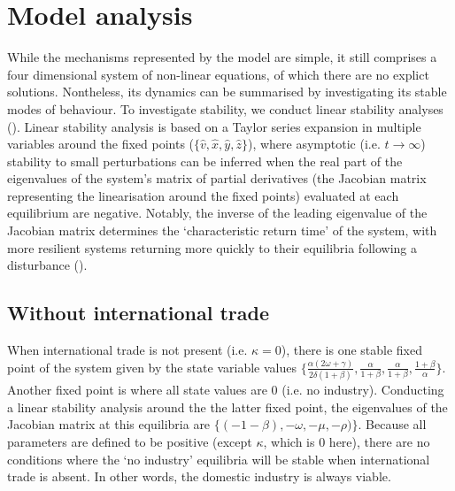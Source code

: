 \documentclass[12pt]{article}
\begin{document}
\section{Model analysis}
While the mechanisms represented by the model are simple, it still comprises a four dimensional system of non-linear equations, of which there are no explict solutions. Nontheless, its dynamics can be summarised by investigating its stable modes of behaviour. To investigate stability, we conduct linear stability analyses (\cite{strogatz1994}). Linear stability analysis is based on a Taylor series expansion in multiple variables around the fixed points ($\{\hat{v}, \hat{x}, \hat{y}, \hat{z}\}$), where asymptotic (i.e. $t \rightarrow \infty$) stability to small perturbations can be inferred when the real part of the eigenvalues of the system's matrix of partial derivatives (the Jacobian matrix representing the linearisation around the fixed points) evaluated at each equilibrium are negative. Notably, the inverse of the leading eigenvalue of the Jacobian matrix determines the `characteristic return time' of the system, with more resilient systems returning more quickly to their equilibria following a disturbance (\cite{pimm1984}).

\subsection{Without international trade}
When international trade is not present (i.e. $\kappa = 0$), there is one stable fixed point of the system given by the state variable values $\big \{\frac{\alpha(2\omega + \gamma)}{2 \delta (1 + \beta)}, \frac{\alpha}{1 + \beta}, \frac{\alpha}{1 + \beta}, \frac{1 + \beta}{\alpha}\big\}$. Another fixed point is where all state values are 0 (i.e. no industry). Conducting a linear stability analysis around the the latter fixed point, the eigenvalues of the Jacobian matrix at this equilibria are $\{(-1 - \beta), - \omega, - \mu, - \rho)\}$.
Because all parameters are defined to be positive (except $\kappa$, which is $0$ here), there are no conditions where the `no industry' equilibria will be stable when international trade is absent. In other words, the domestic industry is always viable.

\iffalse
The Jacbobian matrix ($\boldsymbol{J}$) at this equilibria evalutes to:

\begin{equation}
  \boldsymbol{J} \Big |_{\{\frac{\alpha(2\omega + \gamma)}{2 \delta (1 + \beta)}, \frac{\alpha}{1 + \beta}, \frac{\alpha}{1 + \beta}, \frac{1 + \beta}{\alpha}\}} =
  \begin{pmatrix}
    0   &    0     &  0 &  \frac{\alpha^2(2 \omega + \gamma)}{2 \delta (1 + \beta)} \\
    \delta & - \omega - \frac{\gamma}{4}  &  - \frac{\gamma}{4} & 0 \\
    0      &           0            & -\mu     & - \mu (\frac{\alpha}{1+\beta})^2\\
    0      &   - \rho (\frac{1 + \beta}{\alpha})^2    & \rho (\frac{1+\beta}{\alpha})^2 & 0 \\
  \end{pmatrix}
\end{equation}
\fi
\end{document}
